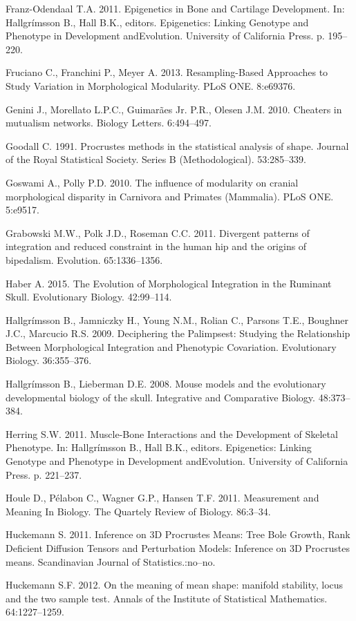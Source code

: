 \documentclass[12pt,]{article}
\begin{document}
Franz-Odendaal T.A. 2011. Epigenetics in Bone and Cartilage Development.
In: Hallgrímsson B., Hall B.K., editors. Epigenetics: Linking Genotype
and Phenotype in Development andEvolution. University of California
Press. p. 195--220.

Fruciano C., Franchini P., Meyer A. 2013. Resampling-Based Approaches to
Study Variation in Morphological Modularity. PLoS ONE. 8:e69376.

Genini J., Morellato L.P.C., Guimarães Jr. P.R., Olesen J.M. 2010.
Cheaters in mutualism networks. Biology Letters. 6:494--497.

Goodall C. 1991. Procrustes methods in the statistical analysis of
shape. Journal of the Royal Statistical Society. Series B
(Methodological). 53:285--339.

Goswami A., Polly P.D. 2010. The influence of modularity on cranial
morphological disparity in Carnivora and Primates (Mammalia). PLoS ONE.
5:e9517.

Grabowski M.W., Polk J.D., Roseman C.C. 2011. Divergent patterns of
integration and reduced constraint in the human hip and the origins of
bipedalism. Evolution. 65:1336--1356.

Haber A. 2015. The Evolution of Morphological Integration in the
Ruminant Skull. Evolutionary Biology. 42:99--114.

Hallgrímsson B., Jamniczky H., Young N.M., Rolian C., Parsons T.E.,
Boughner J.C., Marcucio R.S. 2009. Deciphering the Palimpsest: Studying
the Relationship Between Morphological Integration and Phenotypic
Covariation. Evolutionary Biology. 36:355--376.

Hallgrímsson B., Lieberman D.E. 2008. Mouse models and the evolutionary
developmental biology of the skull. Integrative and Comparative Biology.
48:373--384.

Herring S.W. 2011. Muscle-Bone Interactions and the Development of
Skeletal Phenotype. In: Hallgrímsson B., Hall B.K., editors.
Epigenetics: Linking Genotype and Phenotype in Development andEvolution.
University of California Press. p. 221--237.

Houle D., Pélabon C., Wagner G.P., Hansen T.F. 2011. Measurement and
Meaning In Biology. The Quartely Review of Biology. 86:3--34.

Huckemann S. 2011. Inference on 3D Procrustes Means: Tree Bole Growth,
Rank Deficient Diffusion Tensors and Perturbation Models: Inference on
3D Procrustes means. Scandinavian Journal of Statistics.:no--no.

Huckemann S.F. 2012. On the meaning of mean shape: manifold stability,
locus and the two sample test. Annals of the Institute of Statistical
Mathematics. 64:1227--1259.
\end{document}
